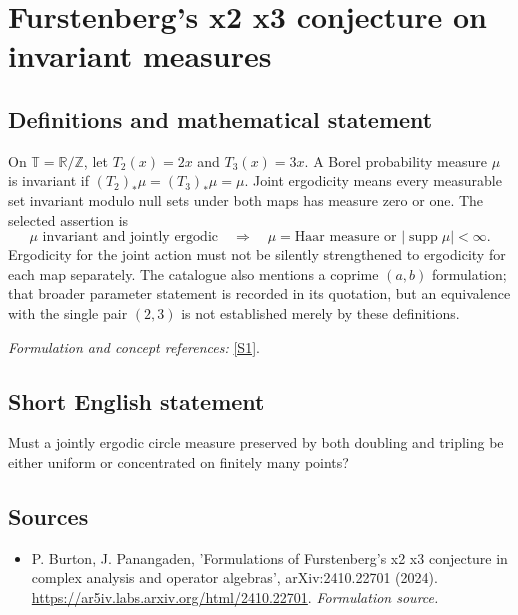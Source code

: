 \documentclass[11pt]{article}
\begin{document}
\section*{\texorpdfstring{Furstenberg's x2 x3 conjecture on invariant measures}{Furstenberg's x2 x3 conjecture on invariant measures}}\label{183}
\subsection{Definitions and mathematical statement}
On $\mathbb T={\mathbb{R}}/{\mathbb{Z}}$, let $T_2(x)=2x$ and $T_3(x)=3x$. A Borel probability measure $\mu$ is invariant if $(T_2)_*\mu=(T_3)_*\mu=\mu$. Joint ergodicity means every measurable set invariant modulo null sets under both maps has measure zero or one. The selected assertion is
\[
 \mu\text{ invariant and jointly ergodic}
 \quad\Longrightarrow\quad
 \mu=\text{Haar measure or }|\operatorname{supp}\mu|<\infty.
\]
Ergodicity for the joint action must not be silently strengthened to ergodicity for each map separately. The catalogue also mentions a coprime $(a,b)$ formulation; that broader parameter statement is recorded in its quotation, but an equivalence with the single pair $(2,3)$ is not established merely by these definitions.
\par\smallskip\textit{Formulation and concept references:} \href{https://ar5iv.labs.arxiv.org/html/2410.22701}{[S1]}.

\subsection{Short English statement}
Must a jointly ergodic circle measure preserved by both doubling and tripling be either uniform or concentrated on finitely many points?
\subsection{Sources}
\begin{itemize}
\item[S1]P. Burton, J. Panangaden, 'Formulations of Furstenberg's x2 x3 conjecture in complex analysis and operator algebras', arXiv:2410.22701 (2024).
\url{https://ar5iv.labs.arxiv.org/html/2410.22701}.
\textit{Formulation source.}
\end{itemize}
\end{document}
